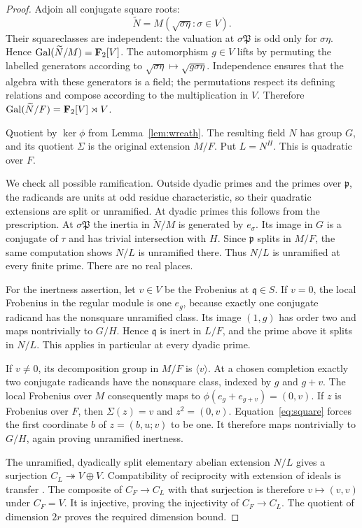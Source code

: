 \begin{proof}
Adjoin all conjugate square roots:
\[
 \widetilde N=M(\sqrt{\sigma\eta}:\sigma\in V).
\]
Their squareclasses are independent: the valuation at
$\sigma\mathfrak P$ is odd only for $\sigma\eta$. Hence
$\operatorname{Gal}(\widetilde N/M)=\mathbf F_2[V]$. The automorphism $g\in V$
lifts by permuting the labelled generators according to
$\sqrt{\sigma\eta}\mapsto\sqrt{g\sigma\eta}$. Independence
ensures that the algebra with these generators is a field; the
permutations respect its defining relations and compose according
to the multiplication in $V$. Therefore
$\operatorname{Gal}(\widetilde N/F)=\mathbf F_2[V]\rtimes V$.

Quotient by $\ker\phi$ from Lemma~\ref{lem:wreath}. The resulting
field $N$ has group $G$, and its quotient $\Sigma$ is the original
extension $M/F$. Put $L=N^H$. This is quadratic over $F$.

We check all possible ramification. Outside dyadic primes and the
primes over $\mathfrak p$, the radicands are units at odd residue
characteristic, so their quadratic extensions are split or
unramified. At dyadic primes this follows from the prescription.
At $\sigma\mathfrak P$ the inertia in $\widetilde N/M$ is generated
by $e_\sigma$. Its image in $G$ is a conjugate of $\tau$ and has
trivial intersection with $H$. Since $\mathfrak p$ splits in
$M/F$, the same computation shows $N/L$ is unramified there.
Thus $N/L$ is unramified at every finite prime. There are no real
places.

For the inertness assertion, let $v\in V$ be the Frobenius at
$\mathfrak q\in S$. If $v=0$, the local Frobenius in the regular
module is one $e_g$, because exactly one conjugate radicand has
the nonsquare unramified class. Its image $(1,g)$ has order two
and maps nontrivially to $G/H$. Hence $\mathfrak q$ is inert in
$L/F$, and the prime above it splits in $N/L$. This applies in
particular at every dyadic prime.

If $v\ne0$, its decomposition group in $M/F$ is $\langle v\rangle$.
At a chosen completion exactly two conjugate radicands have the
nonsquare class, indexed by $g$ and $g+v$. The local Frobenius over
$M$ consequently maps to $\phi(e_g+e_{g+v})=(0,v)$. If $z$ is
Frobenius over $F$, then $\Sigma(z)=v$ and $z^2=(0,v)$.
Equation~\eqref{eq:square} forces the first coordinate $b$ of
$z=(b,u;v)$ to be one. It therefore maps nontrivially to $G/H$,
again proving unramified inertness.

The unramified, dyadically split elementary abelian extension
$N/L$ gives a surjection $C_L\twoheadrightarrow V\oplus V$.
Compatibility of reciprocity with extension of ideals is transfer
\cite[Chapter V, diagram and paragraph after Proposition 3.18,
p.~162]{MilneCFT}. The composite
of $C_F\to C_L$ with that surjection is therefore
$v\mapsto(v,v)$ under $C_F=V$. It is injective, proving the
injectivity of $C_F\to C_L$. The quotient of dimension $2r$
proves the required dimension bound.
\end{proof}

